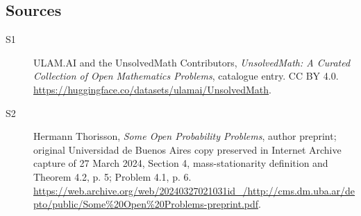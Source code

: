 \documentclass[11pt]{article}
\begin{document}
\subsection{Sources}
\begin{description}
\item[\hypertarget{source:statement:1}{S1}] ULAM.AI and the UnsolvedMath Contributors, \emph{UnsolvedMath: A Curated Collection of Open Mathematics Problems}, catalogue entry. CC BY 4.0. \url{https://huggingface.co/datasets/ulamai/UnsolvedMath}.
\item[\hypertarget{source:statement:2}{S2}] Hermann Thorisson, \emph{Some Open Probability Problems}, author preprint; original Universidad de Buenos Aires copy preserved in Internet Archive capture of 27 March 2024, Section 4, mass-stationarity definition and Theorem 4.2, p. 5; Problem 4.1, p. 6. \url{https://web.archive.org/web/20240327021031id_/http://cms.dm.uba.ar/depto/public/Some%20Open%20Problems-preprint.pdf}.
\end{description}
\label{end:statement}
\end{document}
